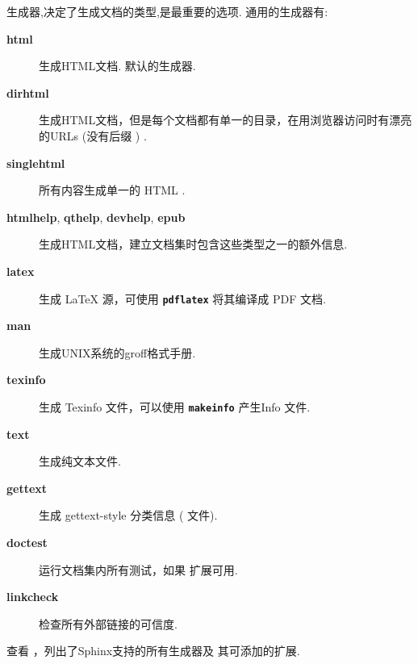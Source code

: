 \documentclass[letterpaper,10pt,english]{sphinxmanual}
\begin{document}
\begin{fulllineitems}
\label{invocation:cmdoption-sphinx-build-b}
生成器,决定了生成文档的类型,是最重要的选项.  通用的生成器有:
\begin{description}
\item[{\textbf{html}}] \leavevmode
生成HTML文档.  默认的生成器.

\item[{\textbf{dirhtml}}] \leavevmode
生成HTML文档，但是每个文档都有单一的目录，在用浏览器访问时有漂亮的URLs (没有后缀  ) .

\item[{\textbf{singlehtml}}] \leavevmode
所有内容生成单一的 HTML .

\item[{\textbf{htmlhelp}, \textbf{qthelp}, \textbf{devhelp}, \textbf{epub}}] \leavevmode
生成HTML文档，建立文档集时包含这些类型之一的额外信息.

\item[{\textbf{latex}}] \leavevmode
生成 LaTeX 源，可使用 \textbf{\texttt{pdflatex}} 将其编译成 PDF 文档.

\item[{\textbf{man}}] \leavevmode
生成UNIX系统的groff格式手册.

\item[{\textbf{texinfo}}] \leavevmode
生成 Texinfo 文件，可以使用 \textbf{\texttt{makeinfo}} 产生Info 文件.

\item[{\textbf{text}}] \leavevmode
生成纯文本文件.

\item[{\textbf{gettext}}] \leavevmode
生成 gettext-style 分类信息  (  文件).

\item[{\textbf{doctest}}] \leavevmode
运行文档集内所有测试，如果 {\hyperref[ext/doctest:module\string-sphinx.ext.doctest]{}} 扩展可用.

\item[{\textbf{linkcheck}}] \leavevmode
检查所有外部链接的可信度.

\end{description}

查看 {\hyperref[builders:builders]{}} ，列出了Sphinx支持的所有生成器及
其可添加的扩展.

\end{fulllineitems}
\end{document}
